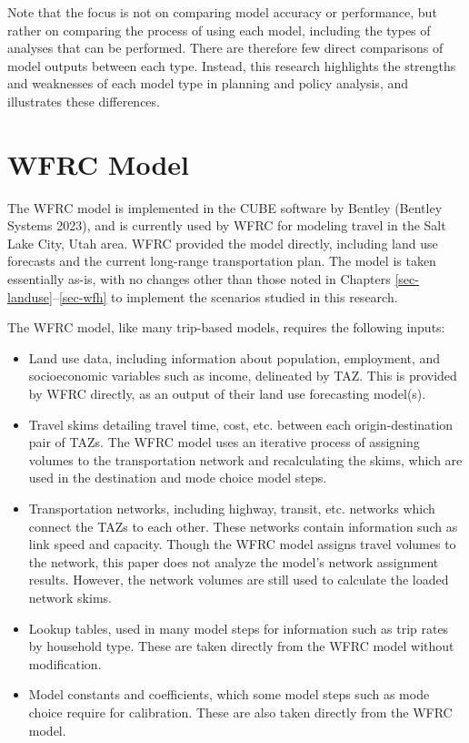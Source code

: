 \documentclass[fancy, twoside, mastersfancy, ms]{byuthesis}
\providecommand{\tightlist}{%
  \setlength{\itemsep}{0pt}\setlength{\parskip}{0pt}}\usepackage{longtable,booktabs,array}
\begin{document}
Note that the focus is not on comparing model accuracy or performance,
but rather on comparing the process of using each model, including the
types of analyses that can be performed. There are therefore few direct
comparisons of model outputs between each type. Instead, this research
highlights the strengths and weaknesses of each model type in planning
and policy analysis, and illustrates these differences.

\section{WFRC Model}\label{wfrc-model}

The WFRC model is implemented in the CUBE software by Bentley (Bentley
Systems 2023), and is currently used by WFRC for modeling travel in the
Salt Lake City, Utah area. WFRC provided the model directly, including
land use forecasts and the current long-range transportation plan. The
model is taken essentially as-is, with no changes other than those noted
in Chapters \ref{sec-landuse}--\ref{sec-wfh} to implement the scenarios
studied in this research.

The WFRC model, like many trip-based models, requires the following
inputs:

\begin{itemize}
\tightlist
\item
  Land use data, including information about population, employment, and
  socioeconomic variables such as income, delineated by TAZ. This is
  provided by WFRC directly, as an output of their land use forecasting
  model(s).
\item
  Travel skims detailing travel time, cost, etc. between each
  origin-destination pair of TAZs. The WFRC model uses an iterative
  process of assigning volumes to the transportation network and
  recalculating the skims, which are used in the destination and mode
  choice model steps.
\item
  Transportation networks, including highway, transit, etc. networks
  which connect the TAZs to each other. These networks contain
  information such as link speed and capacity. Though the WFRC model
  assigns travel volumes to the network, this paper does not analyze the
  model's network assignment results. However, the network volumes are
  still used to calculate the loaded network skims.
\item
  Lookup tables, used in many model steps for information such as trip
  rates by household type. These are taken directly from the WFRC model
  without modification.
\item
  Model constants and coefficients, which some model steps such as mode
  choice require for calibration. These are also taken directly from the
  WFRC model.
\end{itemize}
\end{document}
